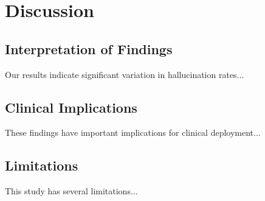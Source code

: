 \section{Discussion}

\subsection{Interpretation of Findings}
Our results indicate significant variation in hallucination rates...

\subsection{Clinical Implications}
These findings have important implications for clinical deployment...

\subsection{Limitations}
This study has several limitations...
